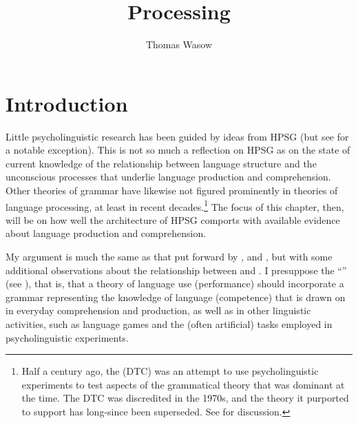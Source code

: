 \documentclass[output=paper
 	        ,biblatex
                ,babelshorthands
                ,newtxmath
                ,draftmode
                ,colorlinks, citecolor=brown
]{langscibook}
\title{Processing}
\author{Thomas Wasow\affiliation{Stanford University}}
\begin{document}
\maketitle
\label{chap-processing}

\section{Introduction}

Little psycholinguistic research has been guided by ideas from HPSG (but see \citealt{Konieczny96a-u} for a notable exception).  This is not so much a reflection on HPSG as on the state of current knowledge of the relationship between language structure and the unconscious processes that underlie language production and comprehension.  Other theories of grammar have likewise not figured prominently in theories of language processing, at least in recent decades.\footnote{Half a century ago, the  (DTC) was an attempt to use psycholinguistic experiments to test aspects of the grammatical theory that was dominant at the time.  The DTC was discredited in the 1970s, and the theory it purported to support has long-since been superseded.  See \citet{FBG74a-u} for discussion.}  The focus of this chapter, then, will be on how well the architecture of HPSG comports with available evidence about language production and comprehension.  

My argument is much the same as that put forward by \citet[Chapter~9]{SWB2003a}, and \citet{SW2011a,SW2015a}, but with some additional observations about the relationship between  and . I presuppose the ``'' (see \citealt[Chapter~1]{Chomsky65a}), that is, that a theory of language use (performance) should incorporate a grammar representing the knowledge of language (competence) that is drawn on in everyday comprehension and production, as well as in other linguistic activities, such as language games and the (often artificial) tasks employed in psycholinguistic experiments.  
\end{document}
